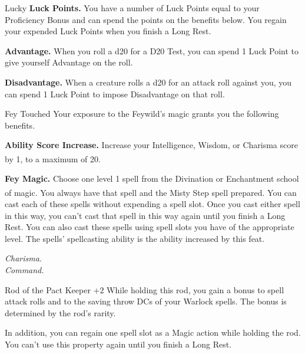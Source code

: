 \begin{Card}[Feat]{Lucky}
\textbf{Luck Points.} You have a number of Luck Points equal to your Proficiency Bonus and can spend the points on the benefits below. You regain your expended Luck Points when you finish a Long Rest.

\textbf{Advantage.} When you roll a d20 for a D20 Test, you can spend 1 Luck Point to give yourself Advantage on the roll.

\textbf{Disadvantage.} When a creature rolls a d20 for an attack roll against you, you can spend 1 Luck Point to impose Disadvantage on that roll.
\end{Card}


\begin{Card}[Feat]{Fey Touched}
Your exposure to the Feywild's magic grants you the following benefits.

\textbf{Ability Score Increase.} Increase your Intelligence, Wisdom, or Charisma score by 1, to a maximum of 20.\textsuperscript{\dag}

\textbf{Fey Magic.} Choose one level 1 spell from the Divination or Enchantment school of magic.\textsuperscript{\ddag} You always have that spell and the Misty Step spell prepared. You can cast each of these spells without expending a spell slot. Once you cast either spell in this way, you can't cast that spell in this way again until you finish a Long Rest. You can also cast these spells using spell slots you have of the appropriate level. The spells' spellcasting ability is the ability increased by this feat.

\vfill {\footnotesize%
\dag\textit{Charisma.} \\
\ddag\textit{Command.}}
\end{Card}


\begin{Card}{Rod of the Pact Keeper $+2$}
  While holding this rod, you gain a bonus to spell attack rolls and to the saving throw DCs of your Warlock spells. The bonus is determined by the rod's rarity.

In addition, you can regain one spell slot as a Magic action while holding the rod. You can't use this property again until you finish a Long Rest.
\end{Card}


